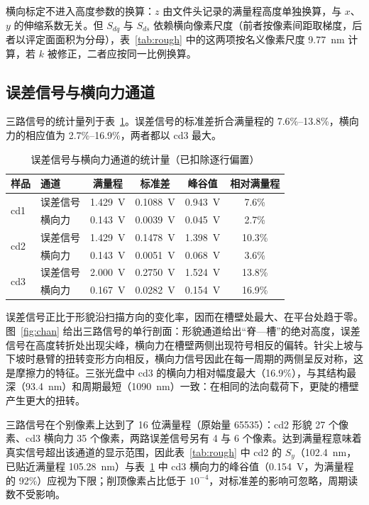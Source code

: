 \documentclass[12pt,a4paper,fontset=windows]{ctexart}
\begin{document}
横向标定不进入高度参数的换算：$z$ 由文件头记录的满量程高度单独换算，与 $x$、$y$ 的伸缩系数无关。但 $S_{dq}$ 与 $S_{ds}$ 依赖横向像素尺度（前者按像素间距取梯度，后者以评定面面积为分母），表~\ref{tab:rough} 中的这两项按名义像素尺度 9.77~nm 计算，若 $k$ 被修正，二者应按同一比例换算。

\subsection{误差信号与横向力通道}

三路信号的统计量列于表~\ref{tab:signal}。误差信号的标准差折合满量程的 7.6\%--13.8\%，横向力的相应值为 2.7\%--16.9\%，两者都以 cd3 最大。

\begin{table}[H]
\centering
\caption{误差信号与横向力通道的统计量（已扣除逐行偏置）}
\label{tab:signal}
\small
{}
\begin{tabular}{@{}llcccc@{}}
\toprule
样品 & 通道 & 满量程 & 标准差 & 峰谷值 & 相对满量程 \\
\midrule
\multirow{2}{*}{cd1} & 误差信号 & 1.429~V & 0.1088~V & 0.943~V & 7.6\% \\
                     & 横向力   & 0.143~V & 0.0039~V & 0.045~V & 2.7\% \\
\multirow{2}{*}{cd2} & 误差信号 & 1.429~V & 0.1478~V & 1.398~V & 10.3\% \\
                     & 横向力   & 0.143~V & 0.0051~V & 0.068~V & 3.6\% \\
\multirow{2}{*}{cd3} & 误差信号 & 2.000~V & 0.2750~V & 1.524~V & 13.8\% \\
                     & 横向力   & 0.167~V & 0.0282~V & 0.154~V & 16.9\% \\
\bottomrule
\end{tabular}
\end{table}

误差信号正比于形貌沿扫描方向的变化率，因而在槽壁处最大、在平台处趋于零。图~\ref{fig:chan} 给出三路信号的单行剖面：形貌通道给出“脊—槽”的绝对高度，误差信号在高度转折处出现尖峰，横向力在槽壁两侧出现符号相反的偏转。针尖上坡与下坡时悬臂的扭转变形方向相反，横向力信号因此在每一周期的两侧呈反对称，这是摩擦力的特征。三张光盘中 cd3 的横向力相对幅度最大（16.9\%），与其结构最深（93.4~nm）和周期最短（1090~nm）一致：在相同的法向载荷下，更陡的槽壁产生更大的扭转。

三路信号在个别像素上达到了 16 位满量程（原始量 65535）：cd2 形貌 27 个像素、cd3 横向力 35 个像素，两路误差信号另有 4 与 6 个像素。达到满量程意味着真实信号超出该通道的显示范围，因此表~\ref{tab:rough} 中 cd2 的 $S_y$（102.4~nm，已贴近满量程 105.28~nm）与表~\ref{tab:signal} 中 cd3 横向力的峰谷值（0.154~V，为满量程的 92\%）应视为下限；削顶像素占比低于 $10^{-4}$，对标准差的影响可忽略，周期读数不受影响。
\end{document}
